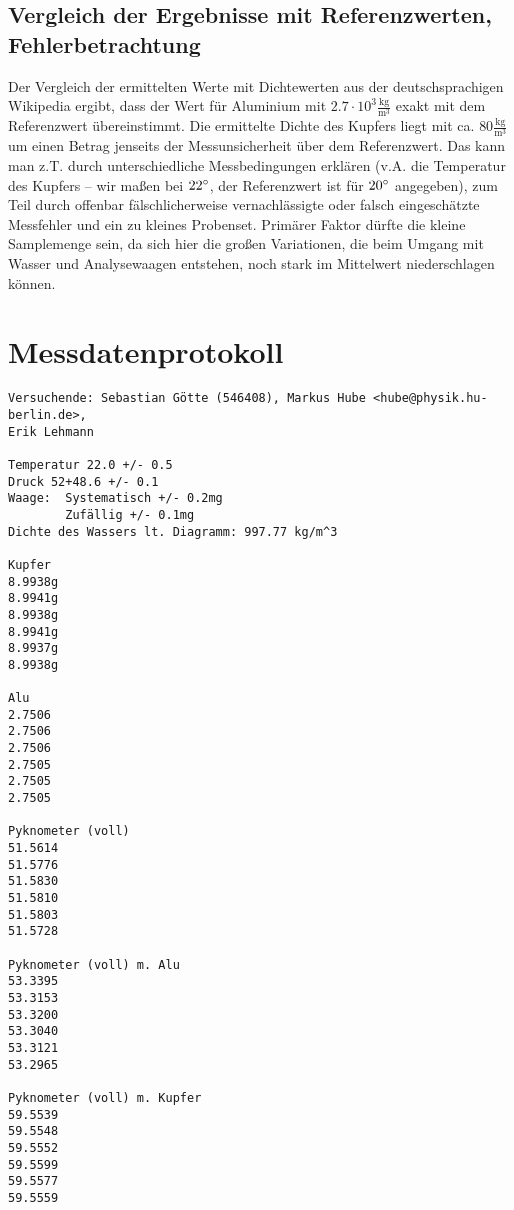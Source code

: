 \documentclass[12pt,a4paper,notitlepage]{article}
\begin{document}
\subsection{Vergleich der Ergebnisse mit Referenzwerten, Fehlerbetrachtung}
Der Vergleich der ermittelten Werte mit Dichtewerten aus der deutschsprachigen Wikipedia ergibt, dass der Wert für Aluminium mit $2.7\cdot10^3\frac{\mathrm{kg}}{\mathrm{m}^3}$ exakt mit dem Referenzwert übereinstimmt. Die ermittelte Dichte des Kupfers liegt mit ca. $80\frac{\mathrm{kg}}{\mathrm{m}^3}$ um einen Betrag jenseits der Messunsicherheit über dem Referenzwert. Das kann man z.T. durch unterschiedliche Messbedingungen erklären (v.A. die Temperatur des Kupfers -- wir maßen bei $22\degree$, der Referenzwert ist für $20\degree$ angegeben), zum Teil durch offenbar fälschlicherweise vernachlässigte oder falsch eingeschätzte Messfehler und ein zu kleines Probenset. Primärer Faktor dürfte die kleine Samplemenge sein, da sich hier die großen Variationen, die beim Umgang mit Wasser und Analysewaagen entstehen, noch stark im Mittelwert niederschlagen können.

\appendix
\section{Messdatenprotokoll}
\label{messdatenprotokoll}
\begin{verbatim}
Versuchende: Sebastian Götte (546408), Markus Hube <hube@physik.hu-berlin.de>,
Erik Lehmann 

Temperatur 22.0 +/- 0.5
Druck 52+48.6 +/- 0.1
Waage:  Systematisch +/- 0.2mg
        Zufällig +/- 0.1mg
Dichte des Wassers lt. Diagramm: 997.77 kg/m^3

Kupfer
8.9938g
8.9941g
8.9938g
8.9941g
8.9937g
8.9938g

Alu
2.7506
2.7506
2.7506
2.7505
2.7505
2.7505

Pyknometer (voll)
51.5614
51.5776
51.5830
51.5810
51.5803
51.5728

Pyknometer (voll) m. Alu
53.3395
53.3153
53.3200
53.3040
53.3121
53.2965

Pyknometer (voll) m. Kupfer
59.5539
59.5548
59.5552
59.5599
59.5577
59.5559

\end{verbatim}
\end{document}
